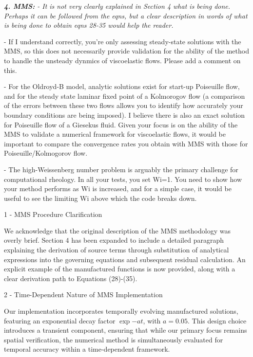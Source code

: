 \documentclass[12pt]{article}
\begin{document}
\vspace{3mm}
{\it \textbf{4. MMS:}
- It is not very clearly explained in Section 4 what is being done. Perhaps it can be followed from the eqns, but a clear description in words of what is being done to obtain eqns 28-35 would help the reader.

- If I understand correctly, you're only assessing steady-state solutions with the MMS, so this does not necessarily provide validation for the ability of the method to handle the unsteady dynmics of viscoelastic flows. Please add a comment on this.

- For the Oldroyd-B model, analytic solutions exist for start-up Poiseuille flow, and for the steady state laminar fixed point of a Kolmorogov flow (a comparison of the errors between these two flows allows you to identify how accurately your boundary conditions are being imposed). I believe there is also an exact solution for Poiseuille flow of a Giesekus fluid. Given your focus is on the ability of the MMS to validate a numerical framework for viscoelastic flows, it would be important to compare the convergence rates you obtain with MMS with those for Poiseuille/Kolmogorov flow.

- The high-Weissenberg number problem is arguably the primary challenge for computational rheology. In all your tests, you set Wi=1. You need to show how your method performs as Wi is increased, and for a simple case, it would be useful to see the limiting Wi above which the code breaks down.}
\vspace{3mm}

1 - MMS Procedure Clarification

We acknowledge that the original description of the MMS methodology was overly brief. Section 4 has been expanded to include a detailed paragraph explaining the derivation of source terms through substitution of analytical expressions into the governing equations and subsequent residual calculation. An explicit example of the manufactured functions is now provided, along with a clear derivation path to Equations (28)-(35).

2 - Time-Dependent Nature of MMS Implementation

Our implementation incorporates temporally evolving manufactured solutions, featuring an exponential decay factor $\exp{-a t}$, with $a = 0.05$. This design choice introduces a transient component, ensuring that while our primary focus remains spatial verification, the numerical method is simultaneously evaluated for temporal accuracy within a time-dependent framework.
\end{document}

